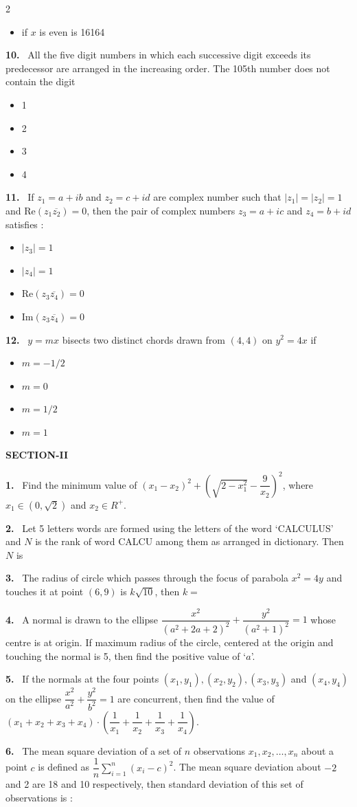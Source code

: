 \documentclass[10pt]{extarticle}
\newcommand{\sect}[1]{\par\smallskip\noindent\textbf{#1}\par}
\newcommand{\qn}[1]{\par\smallskip\noindent\textbf{#1.}~}
\newenvironment{qoptions}{\begin{itemize}[leftmargin=1.8em,itemsep=1pt,topsep=2pt,label={}]}{\end{itemize}}
\newcommand{\opt}[2]{\item[(#1)] #2}
\begin{document}
\begin{multicols}{2}
\begin{qoptions}
\opt{D}{if $x$ is even is 16164}
\end{qoptions}
\qn{10} All the five digit numbers in which each successive digit exceeds its predecessor are arranged in the increasing order. The 105th number does not contain the digit
\begin{qoptions}
\opt{A}{1}
\opt{B}{2}
\opt{C}{3}
\opt{D}{4}
\end{qoptions}
\qn{11} If $z_1=a+ib$ and $z_2=c+id$ are complex number such that $|z_1|=|z_2|=1$ and $\mathrm{Re}\left(z_1\overline{z_2}\right)=0$, then the pair of complex numbers $z_3=a+ic$ and $z_4=b+id$ satisfies :
\begin{qoptions}
\opt{A}{$|z_3|=1$}
\opt{B}{$|z_4|=1$}
\opt{C}{$\mathrm{Re}\left(z_3\overline{z_4}\right)=0$}
\opt{D}{$\mathrm{Im}\left(z_3\overline{z_4}\right)=0$}
\end{qoptions}
\qn{12} $y=mx$ bisects two distinct chords drawn from $(4,4)$ on $y^2=4x$ if
\begin{qoptions}
\opt{A}{$m=-1/2$}
\opt{B}{$m=0$}
\opt{C}{$m=1/2$}
\opt{D}{$m=1$}
\end{qoptions}
\sect{SECTION-II}
\qn{1} Find the minimum value of $\left(x_1-x_2\right)^2+\left(\sqrt{2-x_1^2}-\dfrac9{x_2}\right)^2$, where $x_1\in\left(0,\sqrt2\right)$ and $x_2\in R^+$.
\qn{2} Let 5 letters words are formed using the letters of the word `CALCULUS' and $N$ is the rank of word CALCU among them as arranged in dictionary. Then $N$ is
\qn{3} The radius of circle which passes through the focus of parabola $x^2=4y$ and touches it at point $(6,9)$ is $k\sqrt{10}$, then $k=$
\qn{4} A normal is drawn to the ellipse $\dfrac{x^2}{\left(a^2+2a+2\right)^2}+\dfrac{y^2}{\left(a^2+1\right)^2}=1$ whose centre is at origin. If maximum radius of the circle, centered at the origin and touching the normal is 5, then find the positive value of `$a$'.
\qn{5} If the normals at the four points $(x_1,y_1),(x_2,y_2),(x_3,y_3)$ and $(x_4,y_4)$ on the ellipse $\dfrac{x^2}{a^2}+\dfrac{y^2}{b^2}=1$ are concurrent, then find the value of $\left(x_1+x_2+x_3+x_4\right)\cdot\left(\dfrac1{x_1}+\dfrac1{x_2}+\dfrac1{x_3}+\dfrac1{x_4}\right)$.
\qn{6} The mean square deviation of a set of $n$ observations $x_1,x_2,\dots,x_n$ about a point $c$ is defined as $\dfrac1n\displaystyle\sum_{i=1}^n\left(x_i-c\right)^2$. The mean square deviation about $-2$ and 2 are 18 and 10 respectively, then standard deviation of this set of observations is :
\end{multicols}
\end{document}
